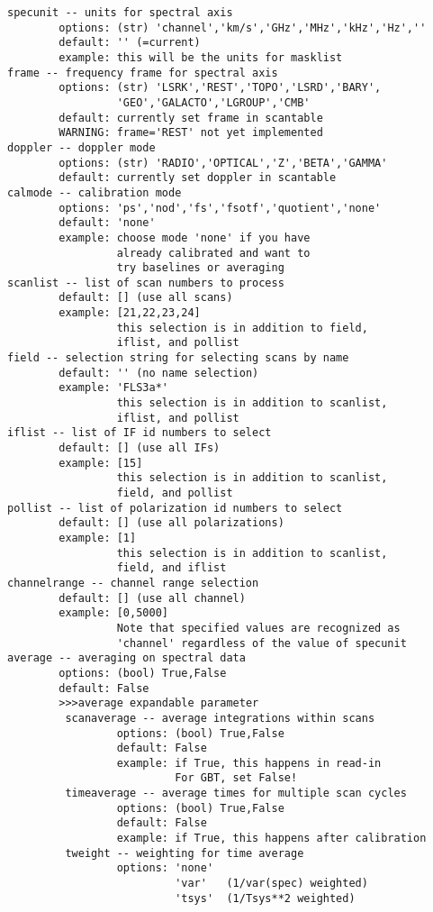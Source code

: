 \begin{verbatim}
specunit -- units for spectral axis
        options: (str) 'channel','km/s','GHz','MHz','kHz','Hz',''
        default: '' (=current)
        example: this will be the units for masklist
frame -- frequency frame for spectral axis
        options: (str) 'LSRK','REST','TOPO','LSRD','BARY',
                 'GEO','GALACTO','LGROUP','CMB'
        default: currently set frame in scantable
        WARNING: frame='REST' not yet implemented
doppler -- doppler mode
        options: (str) 'RADIO','OPTICAL','Z','BETA','GAMMA'
        default: currently set doppler in scantable
calmode -- calibration mode
        options: 'ps','nod','fs','fsotf','quotient','none'
        default: 'none'
        example: choose mode 'none' if you have
                 already calibrated and want to
                 try baselines or averaging
scanlist -- list of scan numbers to process
        default: [] (use all scans)
        example: [21,22,23,24]
                 this selection is in addition to field,
                 iflist, and pollist
field -- selection string for selecting scans by name
        default: '' (no name selection)
        example: 'FLS3a*'
                 this selection is in addition to scanlist,
                 iflist, and pollist
iflist -- list of IF id numbers to select
        default: [] (use all IFs)
        example: [15]
                 this selection is in addition to scanlist,
                 field, and pollist
pollist -- list of polarization id numbers to select
        default: [] (use all polarizations)
        example: [1]
                 this selection is in addition to scanlist,
                 field, and iflist
channelrange -- channel range selection
        default: [] (use all channel)
        example: [0,5000]
                 Note that specified values are recognized as
                 'channel' regardless of the value of specunit
average -- averaging on spectral data
        options: (bool) True,False
        default: False
        >>>average expandable parameter
         scanaverage -- average integrations within scans
                 options: (bool) True,False
                 default: False
                 example: if True, this happens in read-in
                          For GBT, set False!
         timeaverage -- average times for multiple scan cycles
                 options: (bool) True,False
                 default: False
                 example: if True, this happens after calibration
         tweight -- weighting for time average
                 options: 'none'
                          'var'   (1/var(spec) weighted)
                          'tsys'  (1/Tsys**2 weighted)

\end{verbatim}
